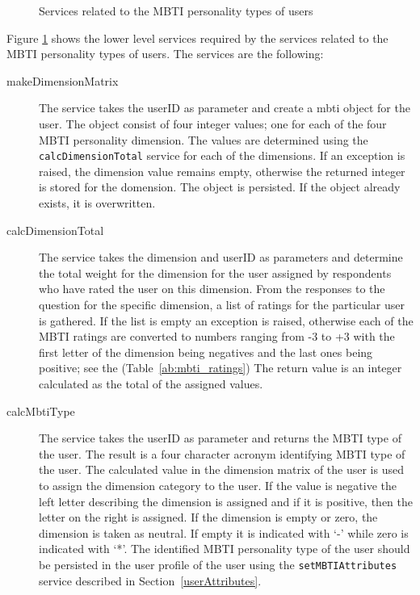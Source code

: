 \begin{figure}[htb]
\begin{center}
\end{center}
\caption{Services related to the MBTI personality types of users \label{fig:mbti_functionalRequirements}}
\end{figure}

Figure \ref{fig:mbti_functionalRequirements} shows the lower level services required by the services related to the MBTI personality types of users. The services are the following:
\begin{description}
\item[makeDimensionMatrix] The service takes the userID as parameter and create a mbti object for the user. The object consist of four integer values; one for each of the four MBTI personality dimension. The values are determined using the \texttt{calcDimensionTotal} service for each of the dimensions. If an exception is raised, the dimension value remains empty, otherwise the returned integer is stored for the domension. The object is persisted. If the object already exists, it is overwritten.
\item[calcDimensionTotal] The service takes the dimension and userID as parameters and determine the total weight for the dimension for the user assigned by respondents who have rated the user on this dimension. From the responses to the question for the specific dimension, a list of ratings for the particular user is gathered. If the list is empty an exception is raised, otherwise each of the MBTI ratings are converted to numbers ranging from -3 to +3 with the first letter of the dimension being negatives and the last ones being positive; see the (Table~\ref{ab:mbti_ratings})  The return value is an integer calculated as the total of the assigned values.
\item[calcMbtiType] The service takes the userID as parameter and returns the MBTI type of the user. The result is a four character acronym identifying MBTI type of the user. The calculated value in the dimension matrix of the user is used to assign the dimension category to the user. If the value is negative the left letter describing the dimension is assigned and if it is positive, then the letter on the right is assigned. If the dimension is empty or zero, the dimension is taken as neutral. If empty it is indicated with `-' while zero is indicated with `*'.  The identified MBTI personality type of the user should be persisted in the user profile of the user using the \texttt{setMBTIAttributes} service described in Section~\ref{userAttributes}.

\end{description}
